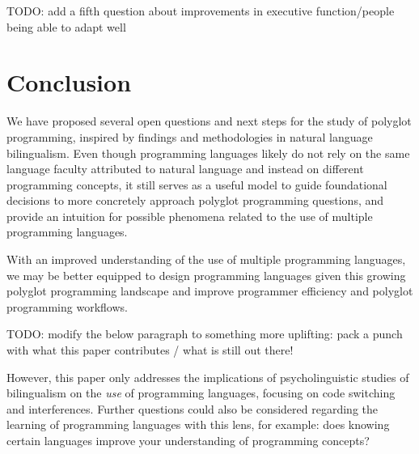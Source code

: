 \documentclass[a4paper,UKenglish,cleveref, autoref]{oasics-v2019}
\begin{document}
TODO: add a fifth question about improvements in executive function/people being able to adapt well 

\section{Conclusion}
We have proposed several open questions and next steps for the study of polyglot programming, inspired by findings and methodologies in natural language bilingualism. Even though programming languages likely do not rely on the same language faculty attributed to natural language and instead on different programming concepts, it still serves as a useful model to guide foundational decisions to more concretely approach polyglot programming questions, and provide an intuition for possible phenomena related to the use of multiple programming languages. 

With an improved understanding of the use of multiple programming languages, we may be better equipped to design programming languages given this growing polyglot programming landscape and improve programmer efficiency and polyglot programming workflows. 

TODO: modify the below paragraph to something more uplifting: pack a punch with what this paper contributes / what is still out there! 

However, this paper only addresses the implications of psycholinguistic studies of bilingualism on the \textit{use} of programming languages, focusing on code switching and interferences. Further questions could also be considered regarding the learning of programming languages with this lens, for example: does knowing certain languages improve your understanding of programming concepts? 

\appendix


\end{document}
